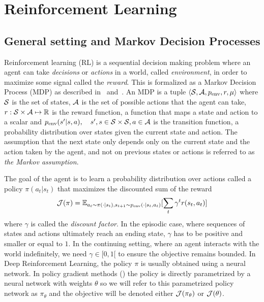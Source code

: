 
\section{Reinforcement Learning}
\label{sec:RL}
\subsection{General setting and Markov Decision Processes}

Reinforcement learning (RL) is a sequential decision making problem where an
agent can take \textit{decisions} or \textit{actions} in a world, called
\textit{environment}, in order to maximize some signal called the
\textit{reward}. This is formalized as a Markov Decision Process (MDP) as
described in~\citet{bellman1954theory} and~\citet{puterman2014markov}. An MDP is
a tuple $\langle {\mathcal{S}}, {\mathcal{A}}, p_{\text{env}}, r, \mu\rangle$ where ${\mathcal{S}}$ is the set of
states, ${\mathcal{A}}$ is the set of possible actions that the agent can take, $r: {\mathcal{S}} \times {\mathcal{A}} \mapsto \mathbb{R}$ is the reward function, a function that maps a state and action to a scalar and $p_{\text{env}}(s' | s, a), \quad s', s \in {\mathcal{S}} \times {\mathcal{S}}, a \in {\mathcal{A}}$ is the transition function, a probability distribution over states given the current state and action. The assumption that the next state only depends only on the current state and the action taken by the agent, and not on previous states or actions is referred to as \emph{the Markov assumption}.

The goal of the agent is to learn a probability distribution over actions called a policy $\pi(a_t|s_t)$ that maximizes the discounted sum of the reward
$${\mathcal{J}}(\pi) = \mathbb{E}_{a_t \sim \pi(\cdot|s_t), s_{t+1} \sim p_{\text{env}}(\cdot | s_t, a_t)}[\sum_t \gamma^t r(s_t, a_t)]$$
where $\gamma$ is called the \emph{discount factor}.
In the episodic case, where sequences of states and actions ultimately reach an ending state, $\gamma$ has to be positive and smaller or equal to $1$. In the continuing setting, where an agent interacts with the world indefinitely, we need $\gamma \in [0, 1 [$ to ensure the objective remains bounded. 
In Deep Reinforcement Learning, the policy $\pi$ is usually obtained using a neural network. In policy gradient methods () the policy is directly parametrized by a neural network with weights $\theta$ so we will refer to this parametrized policy network as $\pi_\theta$ and the objective will be denoted either ${\mathcal{J}}(\pi_\theta)$ or ${\mathcal{J}}(\theta)$.%

